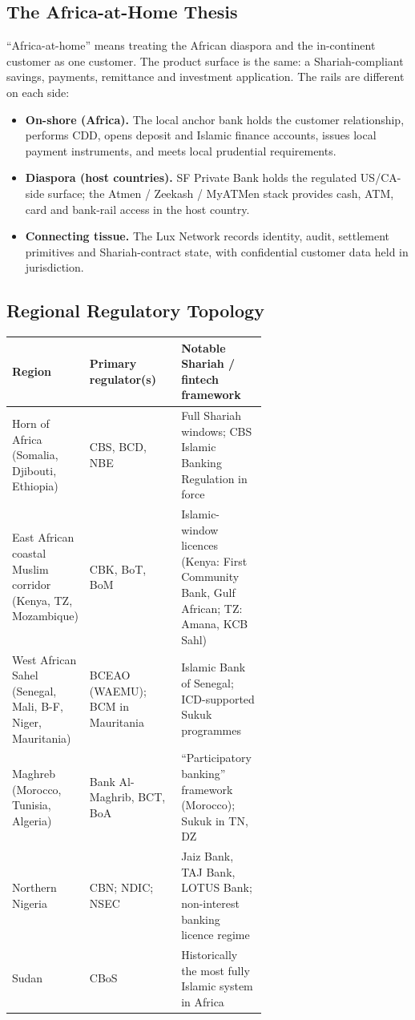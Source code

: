 \documentclass[11pt,letterpaper]{article}
\begin{document}
\subsection{The Africa-at-Home Thesis}
``Africa-at-home'' means treating the African diaspora and the
in-continent customer as one customer. The product surface is the
same: a Shariah-compliant savings, payments, remittance and investment
application. The rails are different on each side:

\begin{itemize}[leftmargin=1.6em]
  \item \textbf{On-shore (Africa).} The local anchor bank holds the
        customer relationship, performs CDD, opens deposit and Islamic
        finance accounts, issues local payment instruments, and meets
        local prudential requirements.
  \item \textbf{Diaspora (host countries).} SF Private Bank holds the
        regulated US/CA-side surface; the Atmen / Zeekash / MyATMen
        stack provides cash, ATM, card and bank-rail access in the
        host country.
  \item \textbf{Connecting tissue.} The Lux Network records identity,
        audit, settlement primitives and Shariah-contract state, with
        confidential customer data held in jurisdiction.
\end{itemize}

\subsection{Regional Regulatory Topology}

\begin{tabularx}{\linewidth}{p{0.27\linewidth} p{0.36\linewidth} Y}
\toprule
\textbf{Region} & \textbf{Primary regulator(s)} & \textbf{Notable
Shariah / fintech framework} \\
\midrule
Horn of Africa (Somalia, Djibouti, Ethiopia) & CBS, BCD, NBE &
Full Shariah windows; CBS Islamic Banking Regulation in force \\[0.3em]
East African coastal Muslim corridor (Kenya, TZ, Mozambique) &
CBK, BoT, BoM & Islamic-window licences (Kenya: First Community Bank,
Gulf African; TZ: Amana, KCB Sahl) \\[0.3em]
West African Sahel (Senegal, Mali, B-F, Niger, Mauritania) &
BCEAO (WAEMU); BCM in Mauritania &
Islamic Bank of Senegal; ICD-supported Sukuk programmes \\[0.3em]
Maghreb (Morocco, Tunisia, Algeria) & Bank Al-Maghrib, BCT, BoA &
``Participatory banking'' framework (Morocco); Sukuk in TN, DZ \\[0.3em]
Northern Nigeria & CBN; NDIC; NSEC & Jaiz Bank, TAJ Bank, LOTUS Bank;
non-interest banking licence regime \\[0.3em]
Sudan & CBoS & Historically the most fully Islamic system in
Africa \\
\bottomrule
\end{tabularx}
\end{document}
